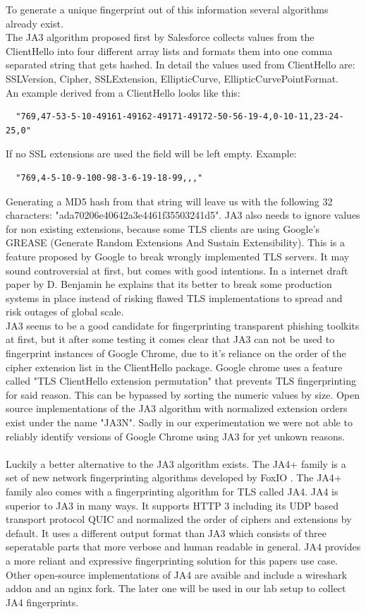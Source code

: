 \documentclass[12pt]{scrbook}
\begin{document}
To generate a unique fingerprint out of this information several algorithms already
exist.\\The JA3 algorithm proposed first by Salesforce \cite{ja3Salesforce}
collects values from the ClientHello into four different array lists and formats
them into one comma separated string that gets hashed. In detail the values used
from ClientHello are: SSLVersion, Cipher, SSLExtension, EllipticCurve,
EllipticCurvePointFormat.\\An example derived from a ClientHello looks like
this:
\begin{verbatim}
  "769,47-53-5-10-49161-49162-49171-49172-50-56-19-4,0-10-11,23-24-25,0"
\end{verbatim}
If no SSL extensions are used the field will be left empty. Example:
\begin{verbatim} 
  "769,4-5-10-9-100-98-3-6-19-18-99,,,"
\end{verbatim}
Generating a MD5 hash
from that string will leave us with the following 32 characters:
"ada70206e40642a3e4461f35503241d5". JA3 also needs to ignore values for non
existing extensions, because some TLS clients are using Google’s GREASE
(Generate Random Extensions And Sustain Extensibility). This is a feature
proposed by Google to break wrongly implemented TLS servers. It may sound
controversial at first, but comes with good intentions. In a internet draft
paper by D. Benjamin \cite{greaseDraft} he explains that its better to break
some production systems in place instead of risking flawed TLS
implementations to spread and risk outages of global scale.\\JA3 seems to be
a good candidate for fingerprinting transparent phishing toolkits at first,
but it after some testing it comes clear that JA3 can not be used to
fingerprint instances of Google Chrome, due to it's reliance on the order of
the cipher extension list in the ClientHello package. Google chrome uses a
feature called "TLS ClientHello extension permutation" that prevents TLS
fingerprinting for said reason. This can be bypassed by sorting the numeric
values by size. Open source implementations of the JA3 algorithm with
normalized extension orders exist under the name "JA3N". Sadly in our
experimentation we were not able to reliably identify versions of Google
Chrome using JA3 for yet unkown reasons.\\ \\Luckily a better alternative
to the JA3 algorithm exists. The JA4+ family is a set of new network
fingerprinting algorithms developed by FoxIO \cite{foxIOJa4}. The JA4+
family also comes with a fingerprinting algorithm for TLS called JA4. JA4 is
superior to JA3 in many ways. It supports HTTP 3 including its UDP based
transport protocol QUIC and normalized the order of ciphers and extensions
by default. It uses a different output format than JA3 which consists of
three seperatable parts that more verbose and human readable in general. JA4
provides a more reliant and expressive fingerprinting solution for this
papers use case. Other open-source implementations of JA4 are avaible and
include a wireshark addon and an nginx fork. The later one will be used in
our lab setup to collect JA4 fingerprints.
\end{document}
